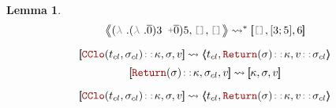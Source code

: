 \documentclass[english, references=cleveref]{programming}
\newtheorem{lemma}[theorem]{Lemma}
\newcommand{\leval}{\left\langle\!\!\left\langle}
\newcommand{\reval}{\right\rangle\!\!\right\rangle}
\newcommand{\lcont}{\left[\!\!\left[}
\newcommand{\rcont}{\right]\!\!\right]}
\begin{document}
\begin{lemma}
  \[{{\leval {{ ( \synlambda. {{{ ( \synlambda. { \overline{\synvar{ 0}} }) } { \ghostvalue { \ghostint 3}}} \synpunct{ +} { \overline{\synvar{ 0}} }}) } { \ghostvalue { \ghostint 5}}}, \synpunct{[]}, \synpunct{[]} \reval} \leadsto^* {\lcont \synpunct{[]}, { [{ \ghostint 3}; { \ghostint 5}] }, {{ \ghostint 6}} \rcont}}\]
\end{lemma}


\[{{\lcont {{ \synCClo( t_{cl}, \sigma_{cl}) } \syncons \kappa}, \sigma, {v} \rcont} \leadsto {\leval t_{cl}, {{ \synReturn( \sigma) } \syncons \kappa}, {v \syncons \sigma_{cl}} \reval}}\]
\[{{\lcont {{ \synReturn( \sigma) } \syncons \kappa}, \sigma_{cl}, {v} \rcont} \leadsto {\lcont \kappa, \sigma, {v} \rcont}}\]


\[{{\lcont {{ \synCClo( t_{cl}, \sigma_{cl}) } \syncons \kappa}, \sigma, {v} \rcont} \leadsto {\leval t_{cl}, {{ \synReturn( \sigma) } \syncons \kappa}, {v \syncons \sigma_{cl}} \reval}}\]
\end{document}
